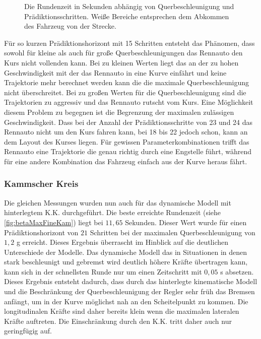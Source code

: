 \documentclass{like}
\begin{document}
\begin{figure}[ht!]
	\centering
	 
	\caption{Die Rundenzeit in Sekunden abhängig von Querbeschleunigung und Prädiktionsschritten. Weiße Bereiche entsprechen dem Abkommen des Fahrzeug von der Strecke.}
	\label{fig:betaMaxFine}
\end{figure}
Für so kurzen Prädiktionshorizont mit 15 Schritten entsteht das Phänomen, dass sowohl für kleine als auch für große Querbeschleunigungen das Rennauto den Kurs nicht vollenden kann. Bei zu kleinen Werten liegt das an der zu hohen Geschwindigkeit mit der das Rennauto in eine Kurve einfährt und keine Trajektorie mehr berechnet werden kann die die maximale Querbeschleunigung nicht überschreitet. Bei zu großen Werten für die Querbeschleunigung sind die Trajektorien zu aggressiv und das Rennauto rutscht vom Kurs. Eine Möglichkeit diesem Problem zu begegnen ist die Begrenzung der maximalen zulässigen Geschwindigkeit. Dass bei der Anzahl der Prädiktionsschritte von 23 und 24 das Rennauto nicht um den Kurs fahren kann, bei 18 bis 22 jedoch schon, kann an dem Layout des Kurses liegen. Für gewissen Parameterkombinationen trifft das Rennauto eine Trajektorie die genau richtig durch eine Engstelle führt, während für eine andere Kombination das Fahrzeug einfach aus der Kurve heraus fährt.

\subsubsection{Kammscher Kreis}
Die gleichen Messungen wurden nun auch für das dynamische Modell mit hinterlegtem \ac{K.K.} durchgeführt. Die beste erreichte Rundenzeit (siehe \ref{fig:betaMaxFineKam}) liegt bei $11,65$ Sekunden. Dieser Wert wurde für einen Prädiktionshorizont von $21$ Schritten bei der maximalen Querbeschleunigung von $1,2$ g erreicht. Dieses Ergebnis überrascht im Hinblick auf die deutlichen Unterschiede der Modelle. Das dynamische Modell das in Situationen in denen stark beschleunigt und gebremst wird deutlich höhere Kräfte übertragen kann, kann sich in der schnellsten Runde nur um einen Zeitschritt mit $0,05$ s absetzen. Dieses Ergebnis entsteht dadurch, dass durch das hinterlegte kinematische Modell und die Beschränkung der Querbeschleunigung der Regler sehr früh das Bremsen anfängt, um in der Kurve möglichst nah an den Scheitelpunkt zu kommen. 
Die longitudinalen Kräfte sind daher bereits klein wenn die maximalen lateralen Kräfte auftreten. Die Einschränkung durch den 
\ac{K.K.} tritt daher auch nur geringfügig auf.
\end{document}
